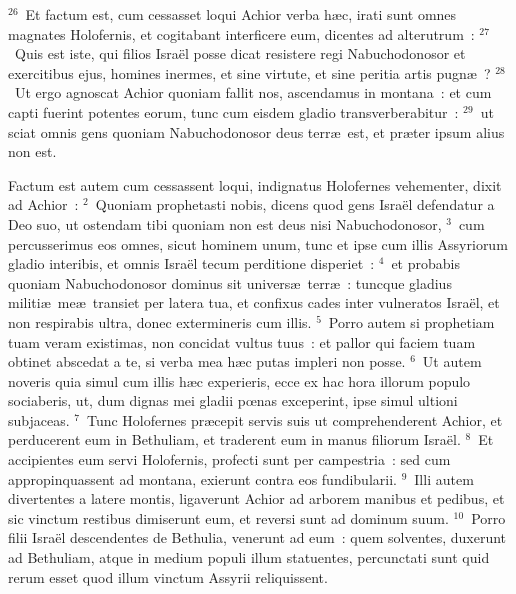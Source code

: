 ${}^{26}$~Et factum est, cum cessasset loqui Achior verba h\ae c, irati sunt omnes magnates Holofernis, et cogitabant interficere eum, dicentes ad alterutrum~:
${}^{27}$~Quis est iste, qui filios Isra\"el posse dicat resistere regi Nabuchodonosor et exercitibus ejus, homines inermes, et sine virtute, et sine peritia artis pugn\ae~?
${}^{28}$~Ut ergo agnoscat Achior quoniam fallit nos, ascendamus in montana~: et cum capti fuerint potentes eorum, tunc cum eisdem gladio transverberabitur~:
${}^{29}$~ut sciat omnis gens quoniam Nabuchodonosor deus terr\ae\ est, et pr\ae ter ipsum alius non est.

\bchapter
\lettrine[lines=3,image=true,loversize=0.05,lraise=-0.03]{F}{}actum est autem cum cessassent loqui, indignatus Holofernes vehementer, dixit ad Achior~:
${}^{2}$~Quoniam prophetasti nobis, dicens quod gens Isra\"el defendatur a Deo suo, ut ostendam tibi quoniam non est deus nisi Nabuchodonosor,
${}^{3}$~cum percusserimus eos omnes, sicut hominem unum, tunc et ipse cum illis Assyriorum gladio interibis, et omnis Isra\"el tecum perditione disperiet~:
${}^{4}$~et probabis quoniam Nabuchodonosor dominus sit univers\ae\ terr\ae~: tuncque gladius militi\ae\ me\ae\ transiet per latera tua, et confixus cades inter vulneratos Isra\"el, et non respirabis ultra, donec extermineris cum illis.
${}^{5}$~Porro autem si prophetiam tuam veram existimas, non concidat vultus tuus~: et pallor qui faciem tuam obtinet abscedat a te, si verba mea h\ae c putas impleri non posse.
${}^{6}$~Ut autem noveris quia simul cum illis h\ae c experieris, ecce ex hac hora illorum populo sociaberis, ut, dum dignas mei gladii pœnas exceperint, ipse simul ultioni subjaceas.
${}^{7}$~Tunc Holofernes pr\ae cepit servis suis ut comprehenderent Achior, et perducerent eum in Bethuliam, et traderent eum in manus filiorum Isra\"el.
${}^{8}$~Et accipientes eum servi Holofernis, profecti sunt per campestria~: sed cum appropinquassent ad montana, exierunt contra eos fundibularii.
${}^{9}$~Illi autem divertentes a latere montis, ligaverunt Achior ad arborem manibus et pedibus, et sic vinctum restibus dimiserunt eum, et reversi sunt ad dominum suum.
${}^{10}$~Porro filii Isra\"el descendentes de Bethulia, venerunt ad eum~: quem solventes, duxerunt ad Bethuliam, atque in medium populi illum statuentes, percunctati sunt quid rerum esset quod illum vinctum Assyrii reliquissent.


